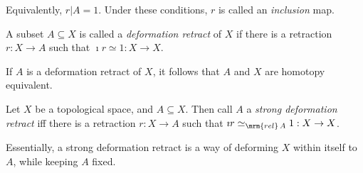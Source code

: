 \documentclass[nocover]{pset}
\newcommand{\htop}[1][A]{\ensuremath\simeq_{\mrm{rel}\, #1}}
\begin{document}
\begin{adjustwidth}{1em}{1em}
\begin{definition}
    Equivalently, $r | A = 1$. Under these conditions, $r$ is called
    an \emph{inclusion} map.
  \end{definition}
  \begin{definition}
    A subset $A \subseteq X$ is called a \emph{deformation retract} of
    $X$ if there is a retraction $r : X \to A$ such that $\imath r
    \simeq 1 : X \to X$.
  \end{definition}
  If $A$ is a deformation retract of $X$, it follows that $A$ and $X$
  are homotopy equivalent.
  \begin{definition}
    Let $X$ be a topological space, and $A \subseteq X$. Then call $A$
    a \emph{strong deformation retract} iff there is a retraction $r :
    X \to A$ such that $\imath r \htop 1 : X \to X$.
  \end{definition}
  Essentially, a strong deformation retract is a way of deforming $X$
  within itself to $A$, while keeping $A$ fixed.
\end{adjustwidth}
\end{document}
